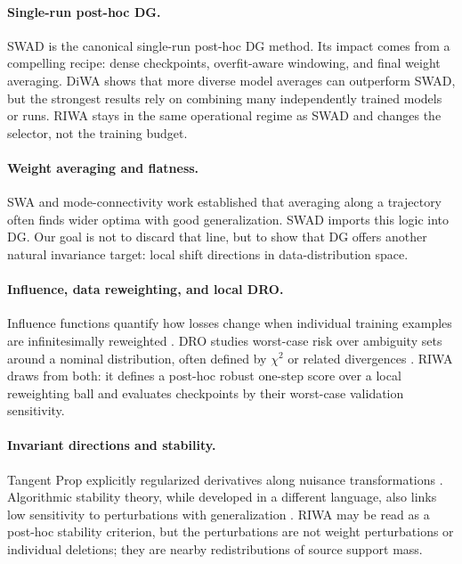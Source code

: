 \documentclass{article}
\newcommand{\riwa}{\textup{\textsc{RIWA}}}
\newcommand{\swad}{\textup{\textsc{SWAD}}}
\begin{document}
\paragraph{Single-run post-hoc DG.}
\swad{} \citep{cha2021wad} is the canonical single-run post-hoc DG method. Its impact comes from a compelling recipe: dense checkpoints, overfit-aware windowing, and final weight averaging. DiWA \citep{rame2022diwa} shows that more diverse model averages can outperform \swad{}, but the strongest results rely on combining many independently trained models or runs. \riwa{} stays in the same operational regime as \swad{} and changes the selector, not the training budget.

\paragraph{Weight averaging and flatness.}
SWA \citep{izmailov2018swa} and mode-connectivity work \citep{garipov2018fge} established that averaging along a trajectory often finds wider optima with good generalization. \swad{} imports this logic into DG. Our goal is not to discard that line, but to show that DG offers another natural invariance target: local shift directions in data-distribution space.

\paragraph{Influence, data reweighting, and local DRO.}
Influence functions quantify how losses change when individual training examples are infinitesimally reweighted \citep{koh2017influence}. DRO studies worst-case risk over ambiguity sets around a nominal distribution, often defined by $\chi^2$ or related divergences \citep{duchi2020variance,duchi2021learning}. \riwa{} draws from both: it defines a post-hoc robust one-step score over a local reweighting ball and evaluates checkpoints by their worst-case validation sensitivity.

\paragraph{Invariant directions and stability.}
Tangent Prop explicitly regularized derivatives along nuisance transformations \citep{simard1991tangent}. Algorithmic stability theory, while developed in a different language, also links low sensitivity to perturbations with generalization \citep{bousquet2002stability}. \riwa{} may be read as a post-hoc stability criterion, but the perturbations are not weight perturbations or individual deletions; they are nearby redistributions of source support mass.
\end{document}

